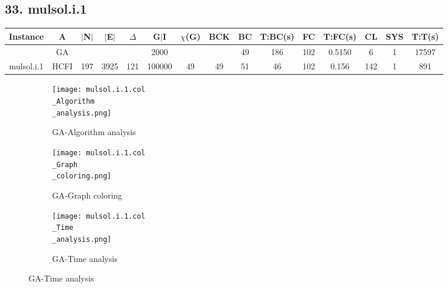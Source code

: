 \documentclass[10pt]{article}
\begin{document}
\subsection*{\hspace{0,9073976cm} 33. mulsol.i.1}
\begin{table}[H]
\centering
\begin{tabular}{|c|c|c|c|c|c|c|c|c|c|c|c|c|c|c|}
\hline
Instance& A &$|$N$|$ & $|$E$|$ & $\Delta$ & G$|$I & $\chi$(G) &BCK&BC & T:BC(s) & FC & T:FC(s) & CL & SYS & T:T(s) \\ \hline \hline

	&GA&       &                   &                     &    2000     &     \cellcolor{yellow} & {\cellcolor{yellow}}& {{\cellcolor{green}49}}
&186   &102        &0.5150                   & 6                   &1          & 17597       \\ \cline{2-2} \cline{6-6} \cline{9-15}
 \multirow{-2}{*}{mulsol.i.1} &HCFI   &\multirow{-2}{*}{197}   &\multirow{-2}{*}{3925}     &\multirow{-2}{*}{121}     &100000     &\multirow{-2}{*}{\cellcolor{yellow}49}      & \multirow{-2}{*}{\cellcolor{yellow}49}    &{\cellcolor{green}51}     &46         &102    &0.156         &142    &1    &891         \\ \hline 
\end{tabular}
\end{table}
\graphicspath{{./Core1/Solutions/GA/mulsol.i.1.col}}
\begin{figure}[H]
\begin{subfigure}{.33\textwidth}
  \centering
  \texttt{[image: mulsol.i.1.col\\\_Algorithm\\\_analysis.png]}
  \caption{GA-Algorithm analysis}
   \label{fig:subfig1}
\end{subfigure}%
\begin{subfigure}{.33\textwidth}
  \centering
  \texttt{[image: mulsol.i.1.col\\\_Graph\\\_coloring.png]}
  \caption{GA-Graph coloring}
  \label{fig:subfig2}
\end{subfigure}
\begin{subfigure}{.33\textwidth}
  \centering
  \texttt{[image: mulsol.i.1.col\\\_Time\\\_analysis.png]}
  \caption{GA-Time analysis}
  \end{subfigure}
\end{figure}
\end{document}
